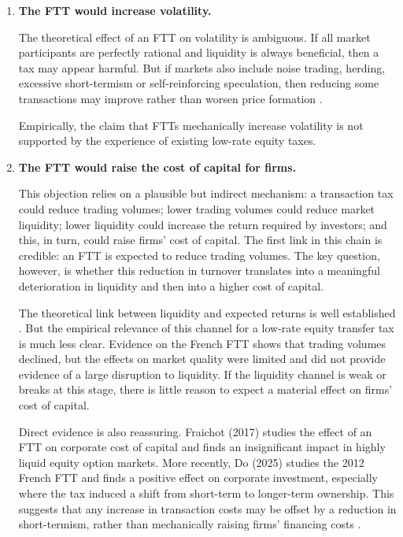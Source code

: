 \documentclass[../../main]{subfiles}
\begin{document}
\begin{enumerate}
    The Swedish case is often used as an argument against FTTs, but its main problem was poor design: the tax was linked to domestic intermediaries and was therefore easy to avoid by relocating transactions. It is not evidence that a well-designed issuance-based tax necessarily decreases liquidity. The proposal considered here focuses on ownership transfers and can preserve exemptions for genuine market-making activities.

    \item \textbf{The FTT would increase volatility.}

    The theoretical effect of an FTT on volatility is ambiguous. If all market participants are perfectly rational and liquidity is always beneficial, then a tax may appear harmful. But if markets also include noise trading, herding, excessive short-termism or self-reinforcing speculation, then reducing some transactions may improve rather than worsen price formation \citep{Matheson2011, McCullochPacillo2011}.

    Empirically, the claim that FTTs mechanically increase volatility is not supported by the experience of existing low-rate equity taxes. 

    \item \textbf{The FTT would raise the cost of capital for firms.}

This objection relies on a plausible but indirect mechanism: a transaction tax could reduce trading volumes; lower trading volumes could reduce market liquidity; lower liquidity could increase the return required by investors; and this, in turn, could raise firms' cost of capital. The first link in this chain is credible: an FTT is expected to reduce trading volumes. The key question, however, is whether this reduction in turnover translates into a meaningful deterioration in liquidity and then into a higher cost of capital.

The theoretical link between liquidity and expected returns is well established \citep{AmihudMendelson1986,Amihud2002}. But the empirical relevance of this channel for a low-rate equity transfer tax is much less clear. Evidence on the French FTT shows that trading volumes declined, but the effects on market quality were limited and did not provide evidence of a large disruption to liquidity. If the liquidity channel is weak or breaks at this stage, there is little reason to expect a material effect on firms' cost of capital.

Direct evidence is also reassuring. Fraichot (2017) studies the effect of an FTT on corporate cost of capital and finds an insignificant impact in highly liquid equity option markets. More recently, Do (2025) studies the 2012 French FTT and finds a positive effect on corporate investment, especially where the tax induced a shift from short-term to longer-term ownership. This suggests that any increase in transaction costs may be offset by a reduction in short-termism, rather than mechanically raising firms' financing costs \citep{Fraichot2017,Do2025}.


\end{enumerate}
\end{document}
